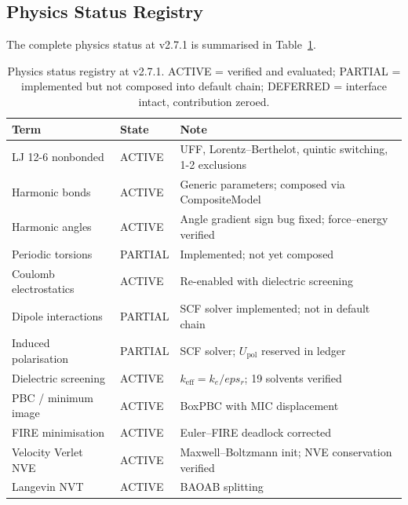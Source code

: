 \documentclass[11pt,twoside]{article}
\def\varepsilon{eps}%
\begin{document}
\subsection{Physics Status Registry}

The complete physics status at v2.7.1 is summarised in Table~\ref{tab:physics-status}.

\begin{table}[H]
\centering
\caption{Physics status registry at v2.7.1. ACTIVE = verified and evaluated; PARTIAL = implemented but not composed into default chain; DEFERRED = interface intact, contribution zeroed.}
\label{tab:physics-status}
\begin{tabular}{lll}
\toprule
\textbf{Term} & \textbf{State} & \textbf{Note} \\
\midrule
LJ 12-6 nonbonded         & ACTIVE  & UFF, Lorentz--Berthelot, quintic switching, 1-2 exclusions \\
Harmonic bonds             & ACTIVE  & Generic parameters; composed via CompositeModel \\
Harmonic angles            & ACTIVE  & Angle gradient sign bug fixed; force--energy verified \\
Periodic torsions          & PARTIAL & Implemented; not yet composed \\
Coulomb electrostatics     & ACTIVE  & Re-enabled with dielectric screening \\
Dipole interactions        & PARTIAL & SCF solver implemented; not in default chain \\
Induced polarisation       & PARTIAL & SCF solver; $U_{\mathrm{pol}}$ reserved in ledger \\
Dielectric screening       & ACTIVE  & $k_{\mathrm{eff}} = k_e / \varepsilon_r$; 19 solvents verified \\
PBC / minimum image        & ACTIVE  & BoxPBC with MIC displacement \\
FIRE minimisation          & ACTIVE  & Euler--FIRE deadlock corrected \\
Velocity Verlet NVE        & ACTIVE  & Maxwell--Boltzmann init; NVE conservation verified \\
Langevin NVT               & ACTIVE  & BAOAB splitting \\
\bottomrule
\end{tabular}
\end{table}


\end{document}
